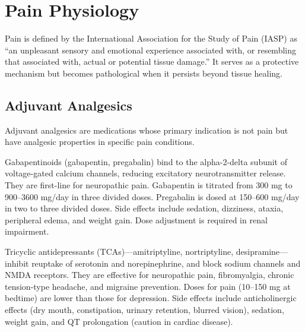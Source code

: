 \section{Pain Physiology}








\label{sec:Pain Physiology}

Pain is defined by the International Association for the Study of Pain (IASP) as ``an unpleasant sensory and emotional experience associated with, or resembling that associated with, actual or potential tissue damage.'' It serves as a protective mechanism but becomes pathological when it persists beyond tissue healing.

\subsection{Adjuvant Analgesics}
\label{sec:Adjuvant Analgesics}

Adjuvant analgesics are medications whose primary indication is not pain but have analgesic properties in specific pain conditions.

Gabapentinoids (gabapentin, pregabalin) bind to the alpha-2-delta subunit of voltage-gated calcium channels, reducing excitatory neurotransmitter release. They are first-line for neuropathic pain. Gabapentin is titrated from 300 mg to 900--3600 mg/day in three divided doses. Pregabalin is dosed at 150--600 mg/day in two to three divided doses. Side effects include sedation, dizziness, ataxia, peripheral edema, and weight gain. Dose adjustment is required in renal impairment.

Tricyclic antidepressants (TCAs)---amitriptyline, nortriptyline, desipramine---inhibit reuptake of serotonin and norepinephrine, and block sodium channels and NMDA receptors. They are effective for neuropathic pain, fibromyalgia, chronic tension-type headache, and migraine prevention. Doses for pain (10--150 mg at bedtime) are lower than those for depression. Side effects include anticholinergic effects (dry mouth, constipation, urinary retention, blurred vision), sedation, weight gain, and QT prolongation (caution in cardiac disease).


